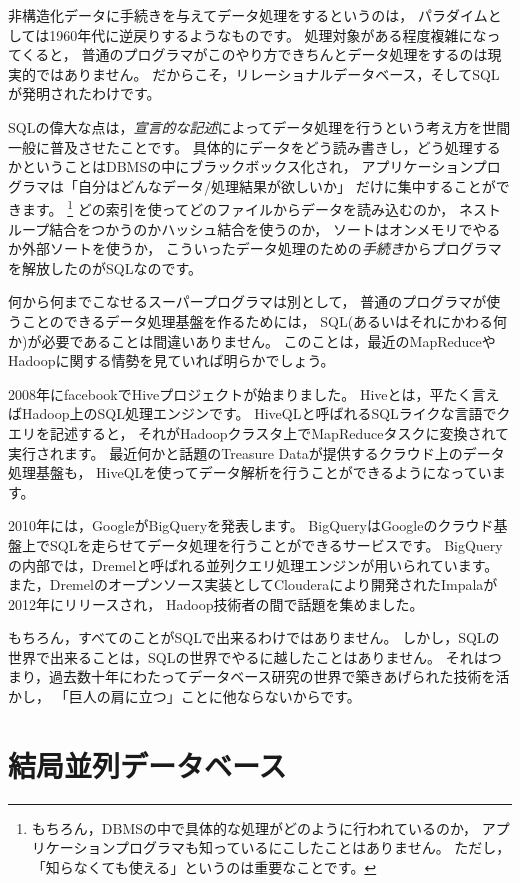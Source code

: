 非構造化データに手続きを与えてデータ処理をするというのは，
パラダイムとしては1960年代に逆戻りするようなものです。
処理対象がある程度複雑になってくると，
普通のプログラマがこのやり方できちんとデータ処理をするのは現実的ではありません。
だからこそ，リレーショナルデータベース，そしてSQLが発明されたわけです。

SQLの偉大な点は，{\em 宣言的な記述}によってデータ処理を行うという考え方を世間一般に普及させたことです。
具体的にデータをどう読み書きし，どう処理するかということはDBMSの中にブラックボックス化され，
アプリケーションプログラマは「自分はどんなデータ/処理結果が欲しいか」
だけに集中することができます。
\footnote{もちろん，DBMSの中で具体的な処理がどのように行われているのか，
アプリケーションプログラマも知っているにこしたことはありません。
ただし，「知らなくても使える」というのは重要なことです。}
どの索引を使ってどのファイルからデータを読み込むのか，
ネストループ結合をつかうのかハッシュ結合を使うのか，
ソートはオンメモリでやるか外部ソートを使うか，
こういったデータ処理のための{\em 手続き}からプログラマを解放したのがSQLなのです。

何から何までこなせるスーパープログラマは別として，
普通のプログラマが使うことのできるデータ処理基盤を作るためには，
SQL(あるいはそれにかわる何か)が必要であることは間違いありません。
このことは，最近のMapReduceやHadoopに関する情勢を見ていれば明らかでしょう。

2008年にfacebookでHiveプロジェクトが始まりました。
Hiveとは，平たく言えばHadoop上のSQL処理エンジンです。
HiveQLと呼ばれるSQLライクな言語でクエリを記述すると，
それがHadoopクラスタ上でMapReduceタスクに変換されて実行されます。
最近何かと話題のTreasure Dataが提供するクラウド上のデータ処理基盤も，
HiveQLを使ってデータ解析を行うことができるようになっています。

2010年には，GoogleがBigQueryを発表します。
BigQueryはGoogleのクラウド基盤上でSQLを走らせてデータ処理を行うことができるサービスです。
BigQueryの内部では，Dremelと呼ばれる並列クエリ処理エンジンが用いられています。
また，Dremelのオープンソース実装としてClouderaにより開発されたImpalaが2012年にリリースされ，
Hadoop技術者の間で話題を集めました。

もちろん，すべてのことがSQLで出来るわけではありません。
しかし，SQLの世界で出来ることは，SQLの世界でやるに越したことはありません。
それはつまり，過去数十年にわたってデータベース研究の世界で築きあげられた技術を活かし，
「巨人の肩に立つ」ことに他ならないからです。

\section{結局並列データベース}


